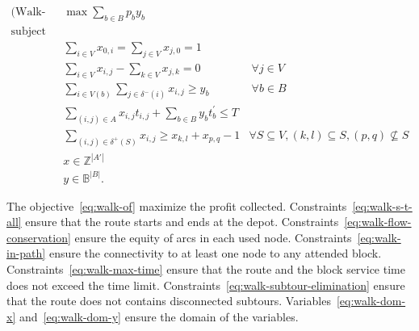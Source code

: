 \begin{align}
	\text{(Walk-CBRP) }          & \max \sum_{b \in B} p_b y_{b}                                             & \label{eq:walk-of}                                                                                 \\
	\nonumber \text{subject to:} &                                                                           &                                                                                                    \\
	                             & \sum_{i \in V} x_{0,i} = \sum_{j \in V} x_{j,0} = 1                       & \label{eq:walk-s-t-all}                                                                            \\
	                             & \sum_{i \in V} x_{i,j} - \sum_{k \in V} x_{j,k} = 0                       & \ \forall j \in V \label{eq:walk-flow-conservation}                                                \\
	                             & \sum_{i \in V(b)} \sum_{j \in \delta^{-}(i)} x_{i,j} \geq y_{b}           & \ \forall b \in B \label{eq:walk-in-path}                                                          \\
	                             & \sum_{(i, j) \in A} x_{i,j}t_{i,j} + \sum_{b \in B} y_{b}t^{'}_{b} \leq T & \label{eq:walk-max-time}                                                                           \\
	                             & \sum_{(i, j) \in \delta^{+}(S)} x_{i,j} \geq x_{k,l} + x_{p,q} - 1        & \forall S \subseteq V, (k, l) \subseteq S, (p, q) \nsubseteq S \label{eq:walk-subtour-elimination} \\	
	                             & x \in \mathbb{Z}^{|A'|}                                                   & \label{eq:walk-dom-x}                                                                              \\
	                             & y \in \mathbb{B}^{|B|}.                                                   & \label{eq:walk-dom-y}
\end{align}

The objective~\eqref{eq:walk-of} maximize the profit collected.
Constraints~\eqref{eq:walk-s-t-all} ensure that the route starts and ends at the
depot. Constraints~\eqref{eq:walk-flow-conservation} ensure the equity of arcs
in each used node. Constraints~\eqref{eq:walk-in-path} ensure the connectivity
to at least one node to any attended block. Constraints~\eqref{eq:walk-max-time}
ensure that the route and the block service time does not exceed the time limit.
Constraints~\eqref{eq:walk-subtour-elimination} ensure that the route does not
contains disconnected subtours. Variables~\eqref{eq:walk-dom-x}
and~\eqref{eq:walk-dom-y} ensure the domain of the variables.

